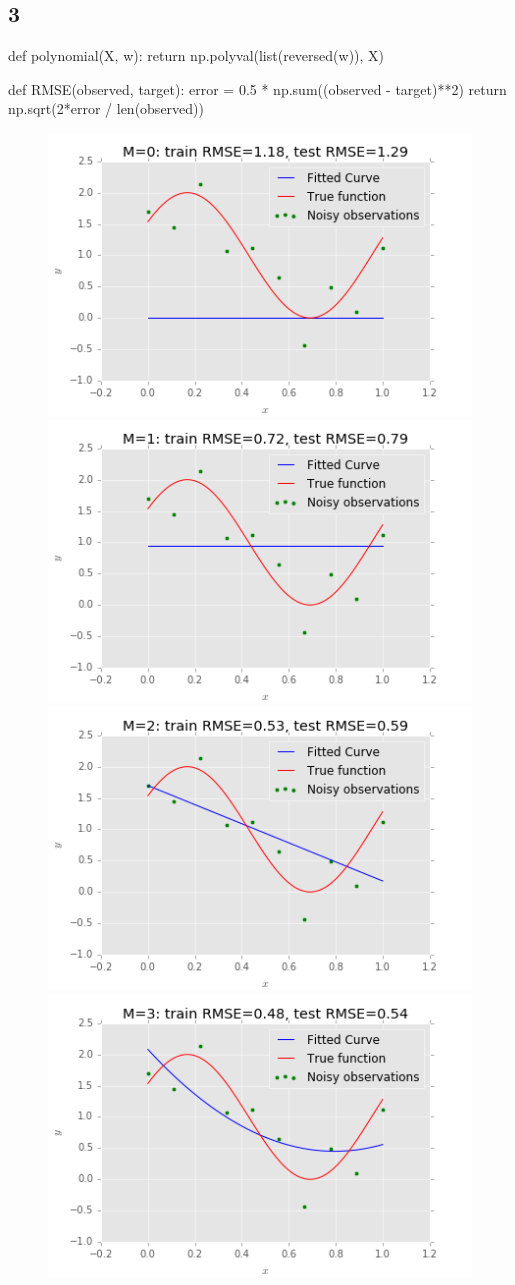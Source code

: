 \documentclass{article}
\begin{document}
\subsection*{3}
\begin{python}
def polynomial(X, w):
    return np.polyval(list(reversed(w)), X)

def RMSE(observed, target):
    error = 0.5 * np.sum((observed - target)**2)
    return np.sqrt(2*error / len(observed))
\end{python}
\begin{figure}[H]
\centering
\includegraphics[width=.49\textwidth]{images/fit_m0_n_10.png}
\includegraphics[width=.49\textwidth]{images/fit_m1_n_10.png}
\includegraphics[width=.49\textwidth]{images/fit_m2_n_10.png}
\includegraphics[width=.49\textwidth]{images/fit_m3_n_10.png}

\end{figure}
\end{document}
